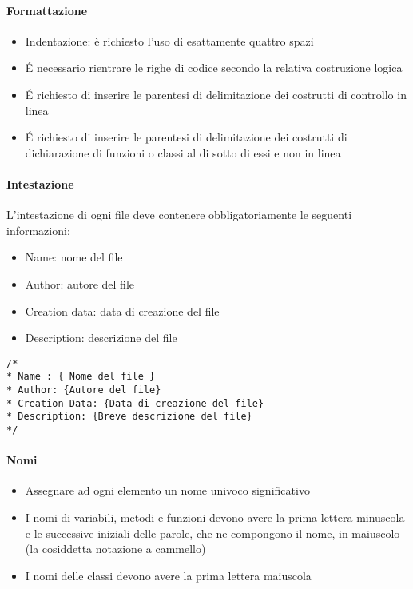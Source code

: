 \paragraph{Formattazione}
\begin{itemize}
\item Indentazione: è richiesto l'uso di esattamente quattro spazi
\item \'E necessario rientrare le righe di codice secondo la relativa costruzione  logica
\item \'E richiesto di inserire le parentesi di delimitazione dei costrutti di controllo in linea
\item \'E richiesto di inserire le parentesi di delimitazione dei costrutti di dichiarazione di funzioni o classi
  al di sotto di essi e non in linea

\end{itemize}

\paragraph{Intestazione}

L'intestazione di ogni file deve contenere obbligatoriamente le seguenti informazioni:
\begin{itemize}
\item Name: nome del file
\item Author: autore del file
\item Creation data: data di creazione del file
\item Description: descrizione del file
\end{itemize}

\begin{verbatim}
/*
* Name : { Nome del file }
* Author: {Autore del file}
* Creation Data: {Data di creazione del file}
* Description: {Breve descrizione del file}
*/
\end{verbatim}

\paragraph{Nomi}
\begin{itemize}
\item Assegnare ad ogni elemento un nome univoco significativo
\item I nomi di variabili, metodi e funzioni devono avere la prima lettera minuscola e  le successive iniziali delle parole, che ne compongono il nome, in maiuscolo (la cosiddetta notazione a cammello)
\item I nomi delle classi devono avere la prima lettera maiuscola
\end{itemize}

